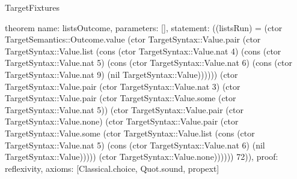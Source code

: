 \begin{lexlean}{TargetFixtures}
\begin{semanticmodule}
theorem{
  name: listsOutcome,
  parameters: [],
  statement: ((listsRun) = (ctor TargetSemantics::Outcome.value (ctor TargetSyntax::Value.pair (ctor TargetSyntax::Value.list (cons (ctor TargetSyntax::Value.nat 4) (cons (ctor TargetSyntax::Value.nat 5) (cons (ctor TargetSyntax::Value.nat 6) (cons (ctor TargetSyntax::Value.nat 9) (nil TargetSyntax::Value)))))) (ctor TargetSyntax::Value.pair (ctor TargetSyntax::Value.nat 3) (ctor TargetSyntax::Value.pair (ctor TargetSyntax::Value.some (ctor TargetSyntax::Value.nat 5)) (ctor TargetSyntax::Value.pair (ctor TargetSyntax::Value.none) (ctor TargetSyntax::Value.pair (ctor TargetSyntax::Value.some (ctor TargetSyntax::Value.list (cons (ctor TargetSyntax::Value.nat 5) (cons (ctor TargetSyntax::Value.nat 6) (nil TargetSyntax::Value))))) (ctor TargetSyntax::Value.none)))))) 72)),
  proof: reflexivity{},
  axioms: [Classical.choice, Quot.sound, propext]
}


\end{semanticmodule}
\end{lexlean}
